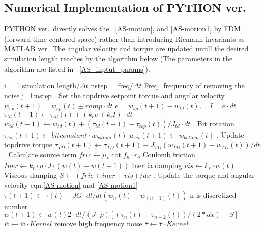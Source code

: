 \subsection{Numerical Implementation of PYTHON ver.}
PYTHON ver.\ directly solves the \equationname~\ref{AS-motion}, and \ref{AS-motion1} by FDM (forward-time-centered-space) rather than introducing Riemann invariants as MATLAB ver.\ The angular velocity and torque are updated untill the desired simulation length reaches by the algorithm below (The parameters in the algorithm are listed in \tablename~\ref{AS_inptut_params}): 
\newcommand{\codecomment}[1]{\hfill #1}
\pushinitialcodeindent{0in}
\begin{code}[\codenumbering]{}
\codeitemnonumber \pseudocodefor{} i = 1 simulation length/$\Delta t$
	\stepcodelevel{}
	\codeitemnonumber nstep = freq/$\Delta t$ \codecomment{Freq=frequency of removing the noise}
	\codeitemnonumber \pseudocodefor{} {j=1:nstep}
		\stepcodelevel{}
	    . Set the topdrive setpoint torque and angular velocity
	    \codeitemnonumber $w_{sp}(t+1)=w_{sp}(t)\pm ramp \cdot dt$
	    \codeitemnonumber $e=w_{sp}(t+1)-w_{td}(t), \quad I=e \cdot dt$
	    \codeitemnonumber $\tau_{td}(t+1) \gets \tau_{td}(t) + (k_e e + k_i I) \cdot dt$
	    \codeitemnonumber $w_{td}(t+1) \gets w_{td}(t) + (\tau_{td}(t+1)-\tau_{top}(t))/J_{td} \cdot dt$
	    . Bit rotation
	    \codeitemnonumber $\tau_{bit}(t+1) \gets bitconstant \cdot w_{bottom}(t)$
	    \codeitemnonumber $w_{bit}(t+1) \gets w_{bottom}(t)$
	    . Update topdrive torque 
	    \codeitemnonumber $\tau_{TD}(t+1) \gets \tau_{TD}(t+1)-J_{TD}(w_{TD}(t+1)-w_{TD}(t))/dt$
	    . Calculate source term
	    \codeitemnonumber $fric \gets \mu_k \cot f_n \cdot r_o$ \codecomment{Coulomb friction}
	    \codeitemnonumber $Iner \gets k_t \cdot \rho \cdot J \cdot (w(t)-w(t-1))$ \codecomment{Inertia damping}
	    \codeitemnonumber $vis \gets k_s \cdot w(t)$ \codecomment{Viscous damping}
	    \codeitemnonumber $S \gets (fric+iner+vis)/dx$
	    . Update the torque and angular velocity \codecomment{eqn.\ref{AS-motion} and \ref{AS-motion1}}
	    \codeitemnonumber $\tau(t+1) \gets \tau(t) - JG \cdot dl/dt (w_n(t)-w_{(n-1)}(t))$ \codecomment{n is discretized number}
	    \codeitemnonumber $w(t+1) \gets w(t) 2 \cdot dt/(J \cdot \rho)\left[(\tau_n(t)-\tau_{n-2}(t))/(2*dx)+S\right]$
	    \prevcodelevel{}
	\codeitemnonumber \pseudocodedonefor{}
	\codeitemnonumber $\overline{w} \gets \overline{w} \cdot Kernel$ \codecomment{remove high frequency noise}
	\codeitemnonumber $\overline{\tau} \gets \overline{\tau} \cdot Kernel$
	\prevcodelevel{}
\codeitemnonumber \pseudocodedonefor{}
\end{code}
\popinitialcodeindent{}

